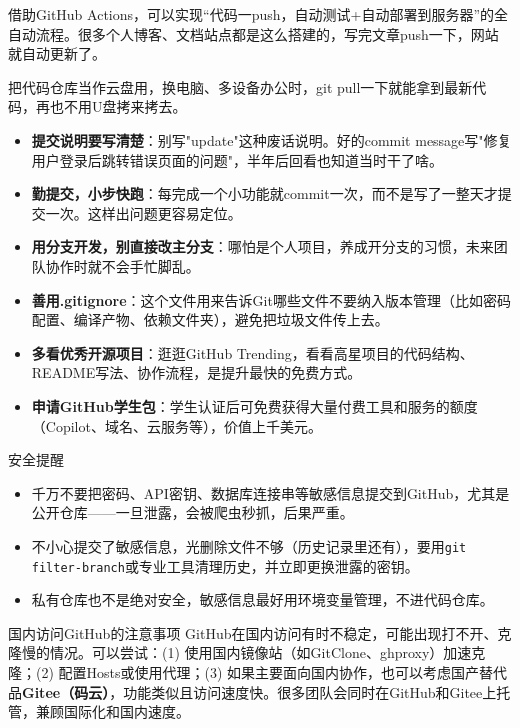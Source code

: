 借助GitHub Actions，可以实现“代码一push，自动测试+自动部署到服务器”的全自动流程。很多个人博客、文档站点都是这么搭建的，写完文章push一下，网站就自动更新了。


把代码仓库当作云盘用，换电脑、多设备办公时，git pull一下就能拿到最新代码，再也不用U盘拷来拷去。


\begin{itemize}
  \item \textbf{提交说明要写清楚}：别写"update"这种废话说明。好的commit message写"修复用户登录后跳转错误页面的问题"，半年后回看也知道当时干了啥。
  \item \textbf{勤提交，小步快跑}：每完成一个小功能就commit一次，而不是写了一整天才提交一次。这样出问题更容易定位。
  \item \textbf{用分支开发，别直接改主分支}：哪怕是个人项目，养成开分支的习惯，未来团队协作时就不会手忙脚乱。
  \item \textbf{善用.gitignore}：这个文件用来告诉Git哪些文件不要纳入版本管理（比如密码配置、编译产物、依赖文件夹），避免把垃圾文件传上去。
  \item \textbf{多看优秀开源项目}：逛逛GitHub Trending，看看高星项目的代码结构、README写法、协作流程，是提升最快的免费方式。
  \item \textbf{申请GitHub学生包}：学生认证后可免费获得大量付费工具和服务的额度（Copilot、域名、云服务等），价值上千美元。
\end{itemize}

\begin{tcbwarn}{安全提醒}
\begin{itemize}
  \item 千万不要把密码、API密钥、数据库连接串等敏感信息提交到GitHub，尤其是公开仓库——一旦泄露，会被爬虫秒抓，后果严重。
  \item 不小心提交了敏感信息，光删除文件不够（历史记录里还有），要用\texttt{git filter-\allowbreak branch}或专业工具清理历史，并立即更换泄露的密钥。
  \item 私有仓库也不是绝对安全，敏感信息最好用环境变量管理，不进代码仓库。
\end{itemize}

\end{tcbwarn}

\begin{tcbinfo}{国内访问GitHub的注意事项}
GitHub在国内访问有时不稳定，可能出现打不开、克隆慢的情况。可以尝试：(1) 使用国内镜像站（如GitClone、ghproxy）加速克隆；(2) 配置Hosts或使用代理；(3) 如果主要面向国内协作，也可以考虑国产替代品\textbf{Gitee（码云）}，功能类似且访问速度快。很多团队会同时在GitHub和Gitee上托管，兼顾国际化和国内速度。

\end{tcbinfo}

